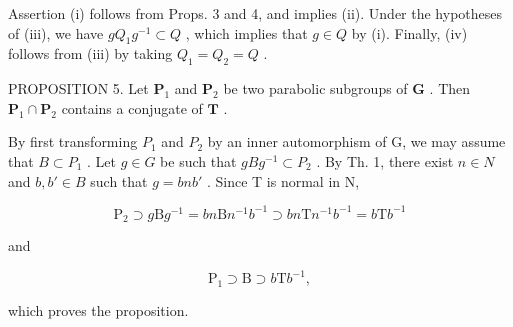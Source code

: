 Assertion (i) follows from Props. 3 and 4, and implies (ii). Under the hypotheses of (iii), we have \(gQ_{1}g^{-1} \subset Q\) , which implies that \(g \in Q\) by (i). Finally, (iv) follows from (iii) by taking \(Q_{1} = Q_{2} = Q\) .

PROPOSITION 5. Let \(\mathbf{P}_1\) and \(\mathbf{P}_2\) be two parabolic subgroups of \(\mathbf{G}\) . Then \(\mathbf{P}_1 \cap \mathbf{P}_2\) contains a conjugate of \(\mathbf{T}\) .

By first transforming \(P_{1}\) and \(P_{2}\) by an inner automorphism of G, we may assume that \(B \subset P_{1}\) . Let \(g \in G\) be such that \(gBg^{-1} \subset P_{2}\) . By Th. 1, there exist \(n \in N\) and \(b, b' \in B\) such that \(g = bnb'\) . Since T is normal in N,

\[
\mathrm{P} _ {2} \supset g \mathrm{B} g ^ {- 1} = b n \mathrm{B} n ^ {- 1} b ^ {- 1} \supset b n \mathrm{T} n ^ {- 1} b ^ {- 1} = b \mathrm{T} b ^ {- 1}
\]

and

\[
\mathrm{P} _ {1} \supset \mathrm{B} \supset b \mathrm{T} b ^ {- 1},
\]

which proves the proposition.

